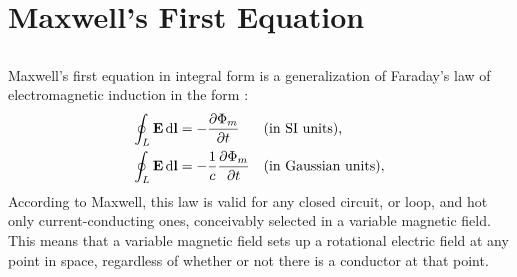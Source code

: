 \section{Maxwell's First Equation}
\label{sec-27.2}


\subsection{}\label{27.2.1} Maxwell's first equation in integral form is a generalization of Faraday's law of electromagnetic induction in the form :
\begin{align*}%
\oint_{L} \vb{E}\, \dd \vb{l} & = - \pdv{\Phi_{m}}{t} && \text{(in SI units),} \\
\oint_{L} \vb{E}\, \dd \vb{l} & = - \frac{1}{c} \pdv{\Phi_{m}}{t} && \text{(in Gaussian units)},
\end{align*}
According to Maxwell, this law is valid for any closed circuit, or loop, and hot only current-conducting ones, conceivably selected in a variable magnetic field. This means that a variable magnetic field sets up a rotational electric field at any point in space, regardless of whether or not there is a conductor at that point.

